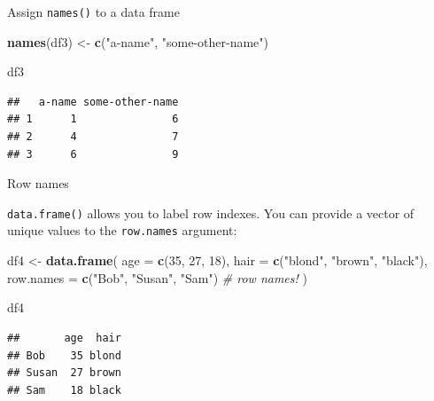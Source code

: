 \documentclass[ignorenonframetext,]{beamer}
\newenvironment{Shaded}{\begin{snugshade}}{\end{snugshade}}
\newcommand{\CommentTok}[1]{\textcolor[rgb]{0.56,0.35,0.01}{\textit{#1}}}
\newcommand{\DataTypeTok}[1]{\textcolor[rgb]{0.13,0.29,0.53}{#1}}
\newcommand{\DecValTok}[1]{\textcolor[rgb]{0.00,0.00,0.81}{#1}}
\newcommand{\KeywordTok}[1]{\textcolor[rgb]{0.13,0.29,0.53}{\textbf{#1}}}
\newcommand{\NormalTok}[1]{#1}
\newcommand{\StringTok}[1]{\textcolor[rgb]{0.31,0.60,0.02}{#1}}
\begin{document}
\begin{frame}[fragile]{Assign \texttt{names()} to a data frame}
\protect\hypertarget{assign-names-to-a-data-frame-1}{}

\begin{Shaded}
\begin{Highlighting}[]
\KeywordTok{names}\NormalTok{(df3) <-}\StringTok{ }\KeywordTok{c}\NormalTok{(}\StringTok{"a-name"}\NormalTok{, }\StringTok{"some-other-name"}\NormalTok{)}

\NormalTok{df3}
\end{Highlighting}
\end{Shaded}

\begin{verbatim}
##   a-name some-other-name
## 1      1               6
## 2      4               7
## 3      6               9
\end{verbatim}

\end{frame}

\begin{frame}[fragile]{Row names}
\protect\hypertarget{row-names}{}

\texttt{data.frame()} allows you to label row indexes. You can provide a
vector of unique values to the \texttt{row.names} argument:

\begin{Shaded}
\begin{Highlighting}[]
\NormalTok{df4 <-}\StringTok{ }\KeywordTok{data.frame}\NormalTok{(}
  \DataTypeTok{age =} \KeywordTok{c}\NormalTok{(}\DecValTok{35}\NormalTok{, }\DecValTok{27}\NormalTok{, }\DecValTok{18}\NormalTok{),}
  \DataTypeTok{hair =} \KeywordTok{c}\NormalTok{(}\StringTok{"blond"}\NormalTok{, }\StringTok{"brown"}\NormalTok{, }\StringTok{"black"}\NormalTok{),}
  \DataTypeTok{row.names =} \KeywordTok{c}\NormalTok{(}\StringTok{"Bob"}\NormalTok{, }\StringTok{"Susan"}\NormalTok{, }\StringTok{"Sam"}\NormalTok{) }\CommentTok{# row names!}
\NormalTok{) }

\NormalTok{df4}
\end{Highlighting}
\end{Shaded}

\begin{verbatim}
##       age  hair
## Bob    35 blond
## Susan  27 brown
## Sam    18 black
\end{verbatim}

\end{frame}
\end{document}
